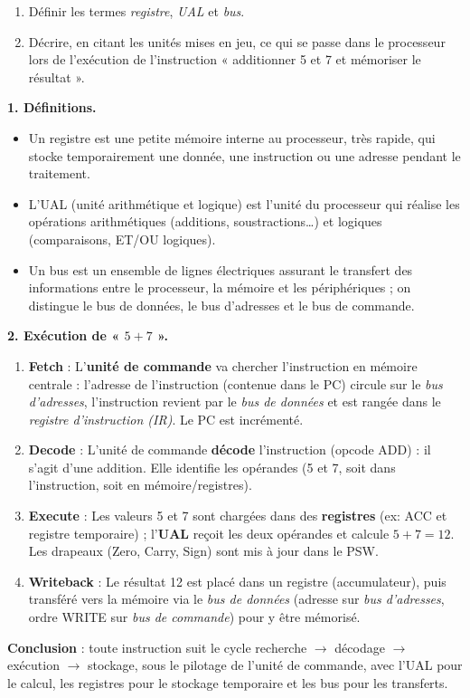\documentclass[11pt]{article}
\newcommand{\cle}[1]{{\popxbold\color{popdark}#1}}
\begin{document}
\begin{exoresolu}
\begin{enumerate}
\item Définir les termes \emph{registre}, \emph{UAL} et \emph{bus}.
\item Décrire, en citant les unités mises en jeu, ce qui se passe dans le processeur lors de l'exécution de l'instruction « additionner 5 et 7 et mémoriser le résultat ».
\end{enumerate}
\tcblower
\textbf{1. Définitions.}
\begin{itemize}
\item Un \cle{registre} est une petite mémoire interne au processeur, très rapide, qui stocke temporairement une donnée, une instruction ou une adresse pendant le traitement.
\item L'\cle{UAL} (unité arithmétique et logique) est l'unité du processeur qui réalise les opérations arithmétiques (additions, soustractions\ldots) et logiques (comparaisons, ET/OU logiques).
\item Un \cle{bus} est un ensemble de lignes électriques assurant le transfert des informations entre le processeur, la mémoire et les périphériques ; on distingue le bus de données, le bus d'adresses et le bus de commande.
\end{itemize}
\textbf{2. Exécution de « $5 + 7$ ».}
\begin{enumerate}
\item \textbf{Fetch} : L'\textbf{unité de commande} va chercher l'instruction en mémoire centrale : l'adresse de l'instruction (contenue dans le PC) circule sur le \emph{bus d'adresses}, l'instruction revient par le \emph{bus de données} et est rangée dans le \emph{registre d'instruction (IR)}. Le PC est incrémenté.
\item \textbf{Decode} : L'unité de commande \textbf{décode} l'instruction (opcode ADD) : il s'agit d'une addition. Elle identifie les opérandes (5 et 7, soit dans l'instruction, soit en mémoire/registres).
\item \textbf{Execute} : Les valeurs 5 et 7 sont chargées dans des \textbf{registres} (ex: ACC et registre temporaire) ; l'\textbf{UAL} reçoit les deux opérandes et calcule $5 + 7 = 12$. Les drapeaux (Zero, Carry, Sign) sont mis à jour dans le PSW.
\item \textbf{Writeback} : Le résultat 12 est placé dans un registre (accumulateur), puis transféré vers la mémoire via le \emph{bus de données} (adresse sur \emph{bus d'adresses}, ordre WRITE sur \emph{bus de commande}) pour y être mémorisé.
\end{enumerate}
\textbf{Conclusion} : toute instruction suit le cycle recherche $\rightarrow$ décodage $\rightarrow$ exécution $\rightarrow$ stockage, sous le pilotage de l'unité de commande, avec l'UAL pour le calcul, les registres pour le stockage temporaire et les bus pour les transferts.
\end{exoresolu}
\end{document}
